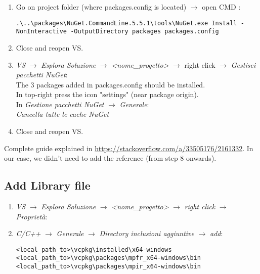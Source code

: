 \documentclass[11pt, english, openany]{report}
\begin{document}
\begin{appendices}
\begin{enumerate}
\item Go on project folder (where packages.config is located) $\rightarrow$ open CMD :

\begin{lstlisting}
.\..\packages\NuGet.CommandLine.5.5.1\tools\NuGet.exe Install -NonInteractive -OutputDirectory packages packages.config
\end{lstlisting}
	
\item Close and reopen VS.

\item \textit{VS} $\rightarrow$ \textit{Esplora Soluzione} $\rightarrow$ \textit{<nome\_progetto>} $\rightarrow$ right click $\rightarrow$ \textit{Gestisci pacchetti NuGet}: \\
The 3 packages added in packages.config should be installed.\\
In top-right press the icon "settings" (near package origin). \\
In \textit{Gestione pacchetti NuGet} $\rightarrow$ \textit{Generale}: \\

	\textit{Cancella tutte le cache NuGet}

\item Close and reopen VS.
\end{enumerate}

Complete guide explained in \href{https://stackoverflow.com/a/33505176/2161332}{https://stackoverflow.com/a/33505176/2161332}. In our case, we didn't need to add the reference (from step 8 onwards).


\subsection{Add Library file}
\begin{enumerate}
\item \textit{VS} $\rightarrow$ \textit{Esplora Soluzione} $\rightarrow$ \textit{<nome\_progetto>} $\rightarrow$ \textit{right click} $\rightarrow$ \textit{Proprietà}:

\item \textit{C/C++} $\rightarrow$ \textit{Generale} $\rightarrow$ \textit{Directory inclusioni aggiuntive} $\rightarrow$ \textit{add}:

\begin{lstlisting}
<local_path_to>\vcpkg\installed\x64-windows
<local_path_to>\vcpkg\packages\mpfr_x64-windows\bin
<local_path_to>\vcpkg\packages\mpir_x64-windows\bin
\end{lstlisting}
	

\end{enumerate}
\end{appendices}
\end{document}
